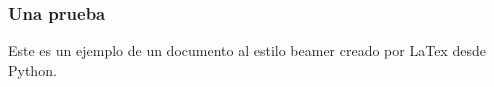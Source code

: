 \documentclass{beamer}
\begin{document}
\begin{frame}
\frametitle{Una prueba}
    Este es un ejemplo de un documento al estilo beamer creado por LaTex desde Python.
\end{frame}
\end{document}
